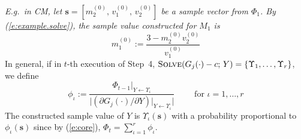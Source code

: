 \documentclass[]{article}
\newcommand{\bvec}[1]{\textbf{#1}}
\newcommand{\pr}{p}
\begin{document}
\emph{E.g.\ in CM, let 
{\footnotesize$\bvec{s} = [ m_2^{(0)}, \, v_1^{(0)}, \, v_2^{(0)} ]$} 
be a sample vector from $\Phi_1$. 
By (\ref{e:example.solve}),  
the sample value constructed for $M_1$ is 
{\footnotesize
$$m_1^{(0)} := \frac{3 - m_2^{(0)}v_2^{(0)}}{v_1^{(0)}}$$ 
}
}%
In general, if in $t$-th execution of Step~4, 
{\footnotesize$\textsc{Solve}(G_j(\cdot)-c ;\, Y) =  \{\Upsilon_1, \ldots, \Upsilon_r \}$},
we define
$$
\phi_\iota := 
\frac{\Phi_{t - 1}|_{Y \leftarrow \Upsilon_\iota}}{
\big|(\partial G_j(\cdot) / \partial Y) |_{Y \leftarrow \Upsilon_\iota}
\big|
}
\qquad \text{ for } \iota = 1, \ldots, r
$$ 
The constructed sample value of $Y$ is 
$\Upsilon_\iota(\bvec{s})$ with a probability proportional to $\phi_\iota(\bvec{s})$ 
since by (\ref{e:core}), $\Phi_t = \sum_{\iota=1}^{r} \phi_{\iota}$.
%

%

\end{document}

